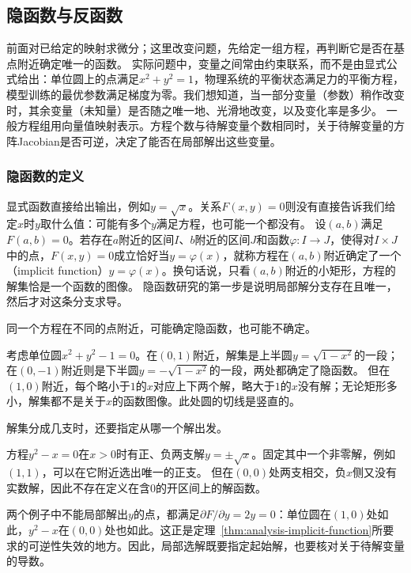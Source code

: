 \subsection{隐函数与反函数}
\label{sec:analysis-implicit-parameter-integral}

前面对已给定的映射求微分；这里改变问题，先给定一组方程，再判断它是否在基点附近确定唯一的函数。
实际问题中，变量之间常由约束联系，而不是由显式公式给出：单位圆上的点满足$x^2+y^2=1$，物理系统的平衡状态满足力的平衡方程，模型训练的最优参数满足梯度为零。我们想知道，当一部分变量（参数）稍作改变时，其余变量（未知量）是否随之唯一地、光滑地改变，以及变化率是多少。
一般方程组用向量值映射表示。方程个数与待解变量个数相同时，关于待解变量的方阵Jacobian是否可逆，决定了能否在局部解出这些变量。

\subsubsection{隐函数的定义}

显式函数直接给出输出，例如$y=\sqrt x$。关系$F(x,y)=0$则没有直接告诉我们给定$x$时$y$取什么值：可能有多个$y$满足方程，也可能一个都没有。
设$(a,b)$满足$F(a,b)=0$。若存在$a$附近的区间$I$、$b$附近的区间$J$和函数$\varphi:I\to J$，使得对$I\times J$中的点，$F(x,y)=0$成立恰好当$y=\varphi(x)$，就称方程在$(a,b)$附近确定了一个（implicit function）$y=\varphi(x)$。换句话说，只看$(a,b)$附近的小矩形，方程的解集恰是一个函数的图像。
隐函数研究的第一步是说明局部解分支存在且唯一，然后才对这条分支求导。

同一个方程在不同的点附近，可能确定隐函数，也可能不确定。
\begin{example}[单位圆附近的隐函数]
\label{ex:multivariable-implicit-circle}
考虑单位圆$x^2+y^2-1=0$。在$(0,1)$附近，解集是上半圆$y=\sqrt{1-x^2}$的一段；在$(0,-1)$附近则是下半圆$y=-\sqrt{1-x^2}$的一段，两处都确定了隐函数。
但在$(1,0)$附近，每个略小于$1$的$x$对应上下两个解，略大于$1$的$x$没有解；无论矩形多小，解集都不是关于$x$的函数图像。此处圆的切线是竖直的。
\end{example}

解集分成几支时，还要指定从哪一个解出发。
\begin{example}[方程$y^2=x$的两支解]
\label{ex:multivariable-implicit-parabola-branches}
方程$y^2-x=0$在$x>0$时有正、负两支解$y=\pm\sqrt x$。固定其中一个非零解，例如$(1,1)$，可以在它附近选出唯一的正支。
但在$(0,0)$处两支相交，负$x$侧又没有实数解，因此不存在定义在含$0$的开区间上的解函数。
\end{example}

两个例子中不能局部解出$y$的点，都满足$\partial F/\partial y=2y=0$：单位圆在$(1,0)$处如此，$y^2-x$在$(0,0)$处也如此。这正是定理~\ref{thm:analysis-implicit-function}所要求的可逆性失效的地方。因此，局部选解既要指定起始解，也要核对关于待解变量的导数。

